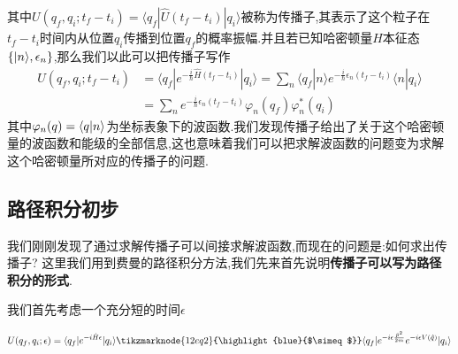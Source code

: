 其中$U(q_f,q_i;t_f-t_i) = \langle q_f|\hat{U}(t_f-t_i)|q_i\rangle $被称为传播子,其表示了这个粒子在$t_f-t_i$时间内从位置$q_i$传播到位置$q_f$的概率振幅.并且若已知哈密顿量$\hat{H}$本征态$\{|n\rangle,\epsilon_n\}$,那么我们以此可以把传播子写作
\begin{equation}
    \begin{aligned}U(q_f,q_i;t_f-t_i)&=\langle q_f|e^{-\frac{i}{\hbar}\hat{H}(t_f-t_i)}|q_i\rangle=\sum_n\langle q_f|n\rangle e^{-\frac{i}{\hbar}\epsilon_n(t_f-t_i)}\langle n|q_i\rangle\\[2ex]&=\sum_ne^{-\frac{i}{\hbar}\epsilon_n(t_f-t_i)}\varphi_n(q_f)\varphi_n^*(q_i)\end{aligned}
\end{equation}
其中$\varphi_n(q)=\langle q|n\rangle$为坐标表象下的波函数.我们发现传播子给出了关于这个哈密顿量的波函数和能级的全部信息,这也意味着我们可以把求解波函数的问题变为求解这个哈密顿量所对应的传播子的问题.
\subsection{路径积分初步}
我们刚刚发现了通过求解传播子可以间接求解波函数,而现在的问题是:如何求出传播子? 这里我们用到费曼的路径积分方法,我们先来首先说明\textbf{传播子可以写为路径积分的形式}.

我们首先考虑一个充分短的时间$\epsilon$

\begin{equation}
    \vspace{\baselineskip}
    U(q_f,q_i;\epsilon)=\langle q_f|e^{-i\hat{H}\epsilon}|q_i\rangle \tikzmarknode{12eq2}{\highlight{blue}{$\simeq$}}\langle q_f|e^{-i\epsilon\frac{\hat{p}^2}{2m}}e^{-i\epsilon V(\hat{q})}|q_i\rangle
\end{equation}

